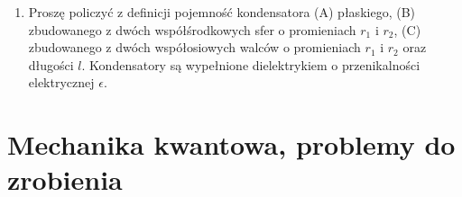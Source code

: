\documentclass[a4paper,11pt]{article}
\begin{document}
\begin{enumerate}
\item Proszę policzyć z definicji pojemność kondensatora (A)
  płaskiego, (B) zbudowanego z dwóch współśrodkowych sfer o
  promieniach $r_{ 1 }$ i $r_{ 2 }$, (C) zbudowanego z dwóch
  współosiowych walców o promieniach $r_{ 1 }$ i $r_{ 2 }$ oraz
  długości $l$. Kondensatory są wypełnione dielektrykiem o
  przenikalności elektrycznej $\epsilon$.



\end{enumerate}










\section{Mechanika kwantowa, problemy do zrobienia}


\end{document}
